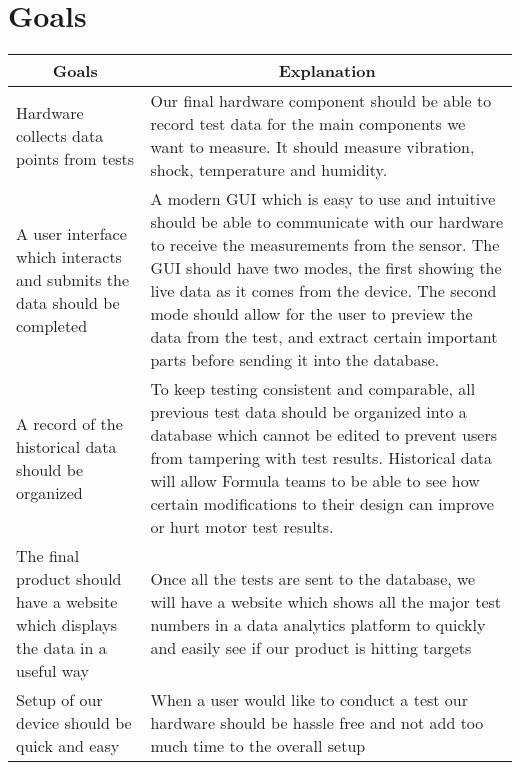 \documentclass{article}
\begin{document}
\section{Goals}
    \begin{table}[!hbt]
        \centering
        \begin{tabular}{|p{4cm}|p{8cm}|}
        \hline
        \multicolumn{1}{|c|}{\large \textbf{Goals}} & \multicolumn{1}{c|}{\large \textbf{Explanation}} 
        \\ \hline
        Hardware collects data points from tests
        & Our final hardware component should be able to record test data for the main components we want to measure. It should measure vibration, shock, temperature and humidity.  
        \newline                                
        \\ \hline
        A user interface which interacts and submits the data should be completed                                  
        & A modern GUI which is easy to use and intuitive should be able to communicate with our hardware to receive the measurements from the sensor. The GUI should have two modes, the first showing the live data as it comes from the device. The second mode should allow for the user to preview the data from the test, and extract certain important parts before sending it into the database.   
        \newline                                
        \\ \hline
        A record of the historical data should be organized                                
        & To keep testing consistent and comparable, all previous test data should be organized into a database which cannot be edited to prevent users from tampering with test results. Historical data will allow Formula teams to be able to see how certain modifications to their design can improve or hurt motor test results. 
        \newline                                
        \\ \hline
        The final product should have a website which displays the data in a useful way                                
        & Once all the  tests are sent to the database, we will have a website which shows all the major test numbers in a data analytics platform to quickly and easily see if our product is hitting targets  
        \newline                              
        \\ \hline
        Setup of our device should be quick and easy                               
        & When a user would like to conduct a test our hardware should be hassle free and not add too much time to the overall setup
        \newline                            
        \\ \hline
        \end{tabular}
    \end{table}
    
\end{document}
